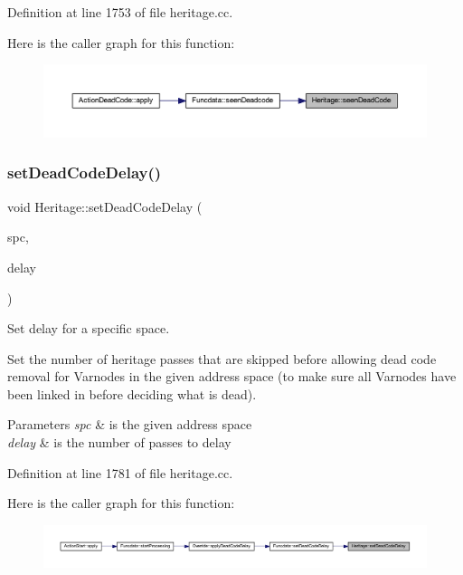 Definition at line 1753 of file heritage.\+cc.

Here is the caller graph for this function\+:
\nopagebreak
\begin{figure}[H]
\begin{center}
\leavevmode
\includegraphics[width=350pt]{class_heritage_abbcd7a583bd605db1177b9c2e0be599f_icgraph}
\end{center}
\end{figure}
\mbox{\label{class_heritage_a8377c55d2b77f230779ad43e341e6a29}} 
\subsubsection{\texorpdfstring{setDeadCodeDelay()}{setDeadCodeDelay()}}
{\footnotesize\ttfamily void Heritage\+::set\+Dead\+Code\+Delay (\begin{DoxyParamCaption}\item[{\mbox{\hyperlink{class_addr_space}{Addr\+Space}} $\ast$}]{spc,  }\item[{int4}]{delay }\end{DoxyParamCaption})}



Set delay for a specific space. 

Set the number of heritage passes that are skipped before allowing dead code removal for Varnodes in the given address space (to make sure all Varnodes have been linked in before deciding what is dead). 
\begin{DoxyParams}{Parameters}
{\em spc} & is the given address space \\
\hline
{\em delay} & is the number of passes to delay \\
\hline
\end{DoxyParams}


Definition at line 1781 of file heritage.\+cc.

Here is the caller graph for this function\+:
\nopagebreak
\begin{figure}[H]
\begin{center}
\leavevmode
\includegraphics[width=350pt]{class_heritage_a8377c55d2b77f230779ad43e341e6a29_icgraph}
\end{center}
\end{figure}


